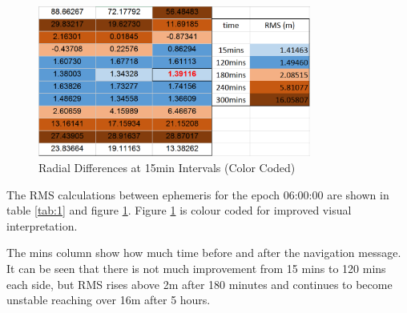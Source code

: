 
\begin{figure}[h]
	\centering
	\includegraphics[width=0.8\textwidth]{rms.png}
	\caption{Radial Differences at 15min Intervals (Color Coded)}
	\label{fig:3}
\end{figure} 
The RMS calculations between ephemeris for the epoch 06:00:00 are shown in table \ref{tab:1} and figure \ref{fig:3}. Figure \ref{fig:3} is colour coded for improved visual interpretation.

The mins column show how much time before and after the navigation message. 
 It can be seen that there is not much improvement from 15 mins to 120 mins each side, but RMS rises above 2m after 180 minutes and continues to become unstable reaching over 16m after 5 hours.
